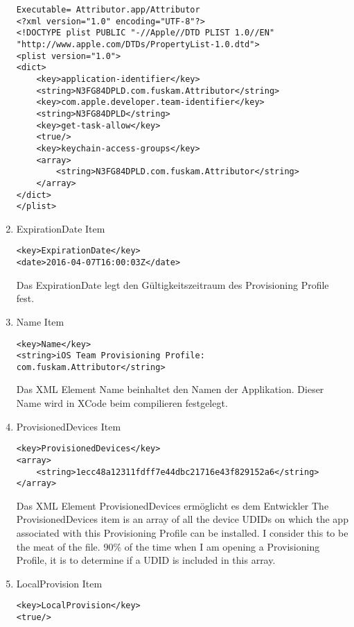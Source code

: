 \begin{enumerate}
\begin{lstlisting}[caption={Listet von En}]
Executable= Attributor.app/Attributor
<?xml version="1.0" encoding="UTF-8"?>
<!DOCTYPE plist PUBLIC "-//Apple//DTD PLIST 1.0//EN" "http://www.apple.com/DTDs/PropertyList-1.0.dtd">
<plist version="1.0">
<dict>
	<key>application-identifier</key>
	<string>N3FG84DPLD.com.fuskam.Attributor</string>
	<key>com.apple.developer.team-identifier</key>
	<string>N3FG84DPLD</string>
	<key>get-task-allow</key>
	<true/>
	<key>keychain-access-groups</key>
	<array>
		<string>N3FG84DPLD.com.fuskam.Attributor</string>
	</array>
</dict>
</plist>
\end{lstlisting}

    \item ExpirationDate Item
\begin{lstlisting}[caption={ExpirationDate Item}]
<key>ExpirationDate</key>
<date>2016-04-07T16:00:03Z</date>
\end{lstlisting}
Das \glqq ExpirationDate\grqq{} legt den Gültigkeitszeitraum des Provisioning Profile fest.

    \item Name Item
\begin{lstlisting}[caption={Name Item}]
<key>Name</key>
<string>iOS Team Provisioning Profile: com.fuskam.Attributor</string>
\end{lstlisting}
Das XML Element \glqq Name\grqq{} beinhaltet den Namen der Applikation. Dieser Name wird in XCode beim compilieren festgelegt.

    \item ProvisionedDevices Item
\begin{lstlisting}[caption={ProvisionedDevices Item}]
<key>ProvisionedDevices</key>
<array>
    <string>1ecc48a12311fdff7e44dbc21716e43f829152a6</string>
</array>
\end{lstlisting}

Das XML Element \glqq ProvisionedDevices\grqq{} ermöglicht es dem Entwickler 
The ProvisionedDevices item is an array of all the device UDIDs on which the app associated with this Provisioning Profile can be installed.  I consider this to be the meat of the file. 90\% of the time when I am opening a Provisioning Profile, it is to determine if a UDID is included in this array.

  \item LocalProvision Item
\begin{lstlisting}[caption={LocalProvision Item}]
<key>LocalProvision</key>
<true/>
\end{lstlisting}


\end{enumerate}

